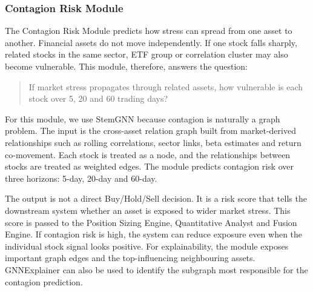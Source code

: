 \documentclass[conference]{IEEEtran}
\begin{document}
\subsubsection{Contagion Risk Module}
The Contagion Risk Module predicts how stress can spread from one asset to another. Financial assets do not move independently. If one stock falls sharply, related stocks in the same sector, ETF group or correlation cluster may also become vulnerable. This module, therefore, answers the question:
\begin{quote}
If market stress propagates through related assets, how vulnerable is each stock over 5, 20 and 60 trading days?
\end{quote}

For this module, we use StemGNN\cite{StemGNN} because contagion is naturally a graph problem. The input is the cross-asset relation graph built from market-derived relationships such as rolling correlations, sector links, beta estimates and return co-movement. Each stock is treated as a node, and the relationships between stocks are treated as weighted edges. The module predicts contagion risk over three horizons: 5-day, 20-day and 60-day.

The output is not a direct Buy/Hold/Sell decision. It is a risk score that tells the downstream system whether an asset is exposed to wider market stress. This score is passed to the Position Sizing Engine, Quantitative Analyst and Fusion Engine. If contagion risk is high, the system can reduce exposure even when the individual stock signal looks positive. For explainability, the module exposes important graph edges and the top-influencing neighbouring assets. GNNExplainer\cite{5thPaper} can also be used to identify the subgraph most responsible for the contagion prediction.
\end{document}
